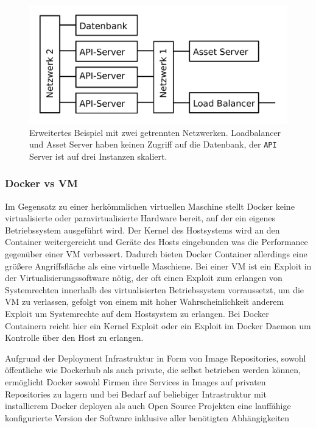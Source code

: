 \begin{figure}
  \includegraphics[width=\columnwidth]{images/docker-services-example.pdf}

  \caption {Erweitertes Beispiel mit zwei getrennten Netzwerken. Loadbalancer
    und Asset   Server haben keinen Zugriff auf die Datenbank, der \texttt{API}
    Server ist auf drei Instanzen skaliert.}
  \label{fig:docker-example-extended}
\end{figure}

\subsubsection{Docker vs VM}

Im Gegensatz zu einer herkömmlichen virtuellen Maschine stellt Docker keine
virtualisierte oder paravirtualisierte Hardware bereit, auf der ein eigenes
Betriebssystem ausgeführt wird. Der Kernel des Hostsystems wird an den Container
weitergereicht und Geräte des Hosts eingebunden was die Performance gegenüber
einer VM verbessert. Dadurch bieten Docker Container allerdings eine größere
Angriffsfläche als eine virtuelle Maschiene. Bei einer VM ist ein Exploit in der
Virtualisierungssoftware nötig, der oft einen Exploit zum erlangen von
Systemrechten innerhalb des virtualisierten Betriebssystem vorraussetzt, um die
VM zu verlassen, gefolgt von einem mit hoher Wahrscheinlichkeit anderem Exploit
um Systemrechte auf dem Hostsystem zu erlangen. Bei Docker Containern reicht
hier ein Kernel Exploit oder ein Exploit im Docker Daemon um Kontrolle über den
Host zu erlangen.

Aufgrund der Deployment Infrastruktur in Form von Image Repositories, sowohl
öffentliche wie Dockerhub als auch private, die selbst betrieben werden können,
ermöglicht Docker sowohl Firmen ihre Services in Images auf privaten
Repositories zu lagern und bei Bedarf auf beliebiger Intrastruktur mit
installierem Docker deployen als auch Open Source Projekten eine lauffähige
konfigurierte Version der Software inklusive aller benötigten Abhängigkeiten 


